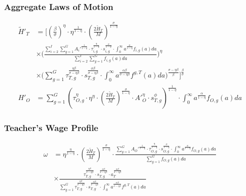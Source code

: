 \documentclass[11pt]{beamer}
\begin{document}
		\begin{frame}
			\frametitle{Aggregate Laws of Motion} 
			\label{laws}
			\begin{align}
				\widetilde{H}'_{T} & = \Bigg[ \left(\tfrac{\beta}{\sigma}\right)^\eta \cdot\eta^{\frac{1}{1-\eta}} \cdot \left(\tfrac{2\widetilde{H}_T}{M}\right)^{\frac{\sigma}{1-\eta}} \nonumber\\
				& \times \Bigg( \frac{\sum_{i=2}^I \sum_{g=1}^G {A_i'}^\frac{1}{1-\eta}\cdot\tau_{i,g}^\frac{\eta}{1-\eta} \cdot s_{i,g}^\frac{\phi}{1-\eta}\cdot \int_0^\infty a^{\frac{\alpha}{1-\eta}} f_{i,g}(a)da}{\sum_{i=2}^I \sum_{g=1}^G f_{i,g}(a)da} \Bigg)^\eta \nonumber\\
				& \times \Bigg(\sum_{g=1}^G \tau_{T,g}^\frac{\eta\beta }{\sigma-\eta\beta } \cdot s_{T,g}^\frac{\phi\beta }{\sigma-\eta\beta } \cdot \int_0^\infty a^\frac{\alpha\beta}{\sigma-\eta\beta } f^{g,T}(a)da \Bigg)^\frac{\sigma-\eta\beta}{\beta} \Bigg]^\frac{\beta}{\sigma} \nonumber\\
				{H}'_{O} & = \sum_{g=1}^G \left( \tau_{O,g}^\eta \cdot \eta^\eta \cdot \left(\tfrac{2\widetilde{H}_T}{M}\right)^\frac{\sigma}{1-\eta}\cdot {A'}_O^\eta \cdot s_{T,g}^\phi \right)^\frac{1}{1-\eta}\cdot \int_0^\infty a^{\frac{\alpha}{1-\eta}} f_{O,g}(a)da \nonumber
			\end{align}
			\hyperlink{eqm}{}
		\end{frame}
		
		\begin{frame}
			\frametitle{Teacher's Wage Profile} 
			\label{wage}
			\begin{align}
				\omega & = \eta^{\frac{\eta}{1-\eta}}\cdot \left(\tfrac{2\widetilde{H}_T}{M}\right)^{\frac{\sigma}{1-\eta}} \cdot \frac{\sum_{g=1}^G {A_O'}^\frac{1}{1-\eta}\cdot\tau_{O,g}^\frac{\eta}{1-\eta} \cdot s_{O,g}^\frac{\phi}{1-\eta}\cdot \int_0^\infty a^{\frac{\alpha}{1-\eta}} f_{O,g}(a)da}{\sum_{g=1}^G f_{O,g}(a)da} \nonumber\\
				& \times \frac{\tau_{T,g}^\frac{\eta\beta}{\sigma-\eta\beta } \cdot s_{T,g}^\frac{\phi\beta }{\sigma-\eta\beta } \cdot a_T^\frac{\alpha\beta }{\sigma-\eta\beta}}{\sum_{g=1}^G \tau_{T,g}^\frac{\eta\beta }{\sigma-\eta\beta } \cdot s_{T,g}^\frac{\phi\beta }{\sigma-\eta\beta } \cdot \int_0^\infty a^\frac{\alpha\beta}{\sigma-\eta\beta } f^{g,T}(a)da} \nonumber
			\end{align}
			\hyperlink{eqm}{\beamergotobutton{Back}}
		\end{frame}
		
\end{document}

